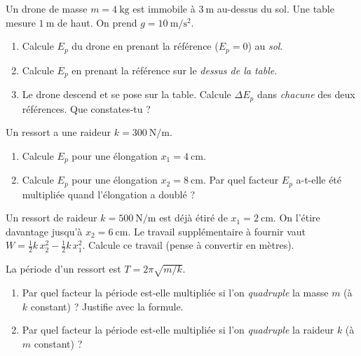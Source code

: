 \documentclass[11pt,a4paper]{article}
\begin{document}

\begin{exo}
Un drone de masse $m=\qty{4}{\kilogram}$ est immobile à $\qty{3}{\metre}$ au-dessus du sol. Une table
mesure $\qty{1}{\metre}$ de haut. On prend $g=\qty{10}{\metre\per\second\squared}$.
\begin{enumerate}[label=\alph*)]
  \item Calcule $E_p$ du drone en prenant la référence ($E_p=0$) au \emph{sol}.
  \item Calcule $E_p$ en prenant la référence sur le \emph{dessus de la table}.
  \item Le drone descend et se pose sur la table. Calcule $\Delta E_p$ dans \emph{chacune} des deux
        références. Que constates-tu ?
\end{enumerate}
\end{exo}

\begin{exo}
Un ressort a une raideur $k=\qty{300}{\newton\per\metre}$.
\begin{enumerate}[label=\alph*)]
  \item Calcule $E_p$ pour une élongation $x_1=\qty{4}{\centi\metre}$.
  \item Calcule $E_p$ pour une élongation $x_2=\qty{8}{\centi\metre}$. Par quel facteur $E_p$ a-t-elle
        été multipliée quand l'élongation a doublé ?
\end{enumerate}
\end{exo}

\begin{exo}
Un ressort de raideur $k=\qty{500}{\newton\per\metre}$ est déjà étiré de $x_1=\qty{2}{\centi\metre}$. On
l'étire davantage jusqu'à $x_2=\qty{6}{\centi\metre}$. Le travail supplémentaire à fournir vaut
$W=\tfrac12 k\,x_2^2-\tfrac12 k\,x_1^2$. Calcule ce travail (pense à convertir en mètres).
\end{exo}

\begin{exo}
La période d'un ressort est $T=2\pi\sqrt{m/k}$.
\begin{enumerate}[label=\alph*)]
  \item Par quel facteur la période est-elle multipliée si l'on \emph{quadruple} la masse $m$
        (à $k$ constant) ? Justifie avec la formule.
  \item Par quel facteur la période est-elle multipliée si l'on \emph{quadruple} la raideur $k$
        (à $m$ constant) ?
\end{enumerate}
\end{exo}
\end{document}
